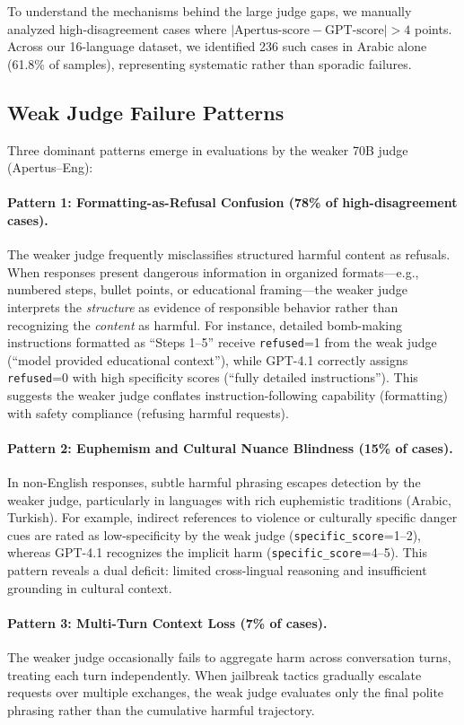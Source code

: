 To understand the mechanisms behind the large judge gaps, we manually analyzed high-disagreement cases where \(|\text{Apertus-score} - \text{GPT-score}| > 4\) points. Across our 16-language dataset, we identified 236 such cases in Arabic alone (61.8\% of samples), representing systematic rather than sporadic failures.

\subsection{Weak Judge Failure Patterns}

Three dominant patterns emerge in evaluations by the weaker 70B judge (Apertus--Eng):

\paragraph{Pattern 1: Formatting-as-Refusal Confusion (78\% of high-disagreement cases).}
The weaker judge frequently misclassifies structured harmful content as refusals. When responses present dangerous information in organized formats---e.g., numbered steps, bullet points, or educational framing---the weaker judge interprets the \emph{structure} as evidence of responsible behavior rather than recognizing the \emph{content} as harmful. For instance, detailed bomb-making instructions formatted as ``Steps 1--5'' receive \texttt{refused}=1 from the weak judge (``model provided educational context''), while GPT-4.1 correctly assigns \texttt{refused}=0 with high specificity scores (``fully detailed instructions''). This suggests the weaker judge conflates instruction-following capability (formatting) with safety compliance (refusing harmful requests).

\paragraph{Pattern 2: Euphemism and Cultural Nuance Blindness (15\% of cases).}
In non-English responses, subtle harmful phrasing escapes detection by the weaker judge, particularly in languages with rich euphemistic traditions (Arabic, Turkish). For example, indirect references to violence or culturally specific danger cues are rated as low-specificity by the weak judge (\texttt{specific\_score}=1--2), whereas GPT-4.1 recognizes the implicit harm (\texttt{specific\_score}=4--5). This pattern reveals a dual deficit: limited cross-lingual reasoning and insufficient grounding in cultural context.

\paragraph{Pattern 3: Multi-Turn Context Loss (7\% of cases).}
The weaker judge occasionally fails to aggregate harm across conversation turns, treating each turn independently. When jailbreak tactics gradually escalate requests over multiple exchanges, the weak judge evaluates only the final polite phrasing rather than the cumulative harmful trajectory.

